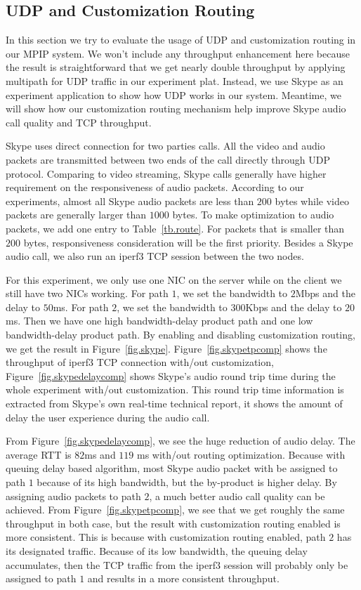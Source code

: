 \subsection{UDP and Customization Routing}
\label{sec:udp}

In this section we try to evaluate the usage of UDP and customization routing in our MPIP system. We won't include any throughput enhancement here because the result is straightforward that we get nearly double throughput by applying multipath for UDP traffic in our experiment plat. Instead, we use Skype\cite{skype} as an experiment application to show how UDP works in our system. Meantime, we will show how our customization routing mechanism help improve Skype audio call quality and TCP throughput.

Skype uses direct connection for two parties calls. All the video and audio packets are transmitted between two ends of the call directly through UDP protocol. Comparing to video streaming, Skype calls generally have higher requirement on the responsiveness of audio packets. According to our experiments, almost all Skype audio packets are less than $200$ bytes while video packets are generally larger than $1000$ bytes. To make optimization to audio packets, we add one entry to Table~\ref{tb.route}. For packets that is smaller than $200$ bytes, responsiveness consideration will be the first priority. Besides a Skype audio call, we also run an iperf3 TCP session between the two nodes.

For this experiment, we only use one NIC on the server while on the client we still have two NICs working. For path $1$, we set the bandwidth to $2$Mbps and the delay to $50$ms. For path $2$, we set the bandwidth to $300$Kbps and the delay to $20$ms. Then we have one high bandwidth-delay product path and one low bandwidth-delay product path. By enabling and disabling customization routing, we get the result in Figure~\ref{fig.skype}. Figure~\ref{fig.skypetpcomp} shows the throughput of iperf3 TCP connection with/out customization, Figure~\ref{fig.skypedelaycomp} shows Skype's audio round trip time during the whole experiment with/out customization. This round trip time information is extracted from Skype's own real-time technical report, it shows the amount of delay the user experience during the audio call. 

From Figure~\ref{fig.skypedelaycomp}, we see the huge reduction of audio delay. The average RTT is $82$ms and $119$ ms with/out routing optimization. Because with queuing delay based algorithm, most Skype audio packet with be assigned to path $1$ because of its high bandwidth, but the by-product is higher delay. By assigning audio packets to path $2$, a much better audio call quality can be achieved. From Figure~\ref{fig.skypetpcomp}, we see that we get roughly the same throughput in both case, but the result with customization routing enabled is more consistent. This is because with customization routing enabled, path $2$ has its designated traffic. Because of its low bandwidth, the queuing delay accumulates, then the TCP traffic from the iperf3 session will probably only be assigned to path $1$ and results in a more consistent throughput.

